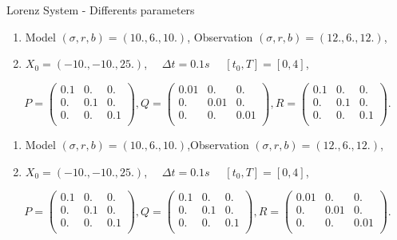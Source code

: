 	\begin{frame}[allowframebreaks]{Lorenz System - Differents parameters}
       
       \begin{enumerate}[\textbullet]
           \item Model $(\sigma, r, b)=(10.,6.,10.)$, Observation $(\sigma, r, b)=(12.,6.,12.)$,
           \item $X_0=(-10.,-10.,25.)$, $\quad \Delta t=0.1s$ $\quad [t_0,T]=[0,4]$,
           \end{enumerate}
           $$P=\begin{pmatrix}
           0.1 & 0. & 0. \\
            0. & 0.1 & 0. \\
           0. & 0. & 0.1 \\
           \end{pmatrix} ,
           Q=\begin{pmatrix}
            0.01 & 0. & 0. \\
           0. & 0.01 & 0. \\
           0. & 0. & 0.01 \\
           \end{pmatrix},
           R=\begin{pmatrix}
           0.1 & 0. & 0. \\
           0. & 0.1 & 0. \\
           0. & 0. & 0.1 \\
           \end{pmatrix}.$$
   
       \begin{figure}
           \centering
       \end{figure}
   
       \newpage
    
       \begin{enumerate}[\textbullet]
                \item Model $(\sigma, r, b)=(10.,6.,10.)$,Observation $(\sigma, r, b)=(12.,6.,12.)$,
               \item $X_0=(-10.,-10.,25.)$, $\quad \Delta t=0.1s$ $\quad [t_0,T]=[0,4]$,
       \end{enumerate}
       $$P=\begin{pmatrix}
       0.1 & 0. & 0. \\
       0. & 0.1 & 0. \\
       0. & 0. & 0.1 \\
       \end{pmatrix} ,
       Q=\begin{pmatrix}
       0.1 & 0. & 0. \\
       0. & 0.1 & 0. \\
       0. & 0. & 0.1 \\
       \end{pmatrix},
       R=\begin{pmatrix}
       0.01 & 0. & 0. \\
       0. & 0.01 & 0. \\
       0. & 0. & 0.01 \\
       \end{pmatrix}.$$ 
   

\end{frame}
